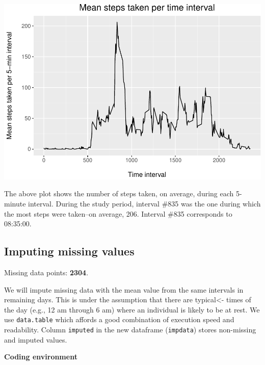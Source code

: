 \documentclass[
  paper=a4,
  ,captions=tableheading
]{scrartcl}
\newenvironment{Shaded}{\begin{snugshade}}{\end{snugshade}}
\newcommand{\CommentTok}[1]{\textcolor[rgb]{0.56,0.35,0.01}{\textit{#1}}}
\newcommand{\FunctionTok}[1]{\textcolor[rgb]{0.00,0.00,0.00}{#1}}
\newcommand{\NormalTok}[1]{#1}
\newcommand{\OtherTok}[1]{\textcolor[rgb]{0.56,0.35,0.01}{#1}}
\newcommand{\SpecialCharTok}[1]{\textcolor[rgb]{0.00,0.00,0.00}{#1}}
\begin{document}
\includegraphics{PA1_template_files/figure-latex/time-series-1.pdf}

\begin{Shaded}
\end{Shaded}

The above plot shows the number of steps taken, on average, during each
5-minute interval. During the study period, interval \#835 was the one
during which the most steps were taken--on average, 206. Interval \#835
corresponds to 08:35:00.

\hypertarget{imputing-missing-values}{%
\subsection{Imputing missing values}\label{imputing-missing-values}}

Missing data points: \textbf{2304}.

We will impute missing data with the mean value from the same intervals
in remaining days. This is under the assumption that there are
typical\textless- times of the day (e.g., 12 am through 6 am) where an
individual is likely to be at rest. We use \texttt{data.table} which
affords a good combination of execution speed and readability. Column
\texttt{imputed} in the new dataframe (\texttt{impdata}) stores
non-missing and imputed values.

\textbf{Coding environment}
\end{document}
